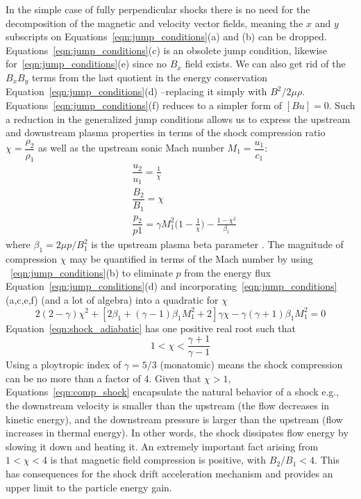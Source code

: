 In the simple case of fully perpendicular shocks there is no need for the decomposition of the magnetic and velocity vector fields, meaning the $x$ and $y$ subscripts on Equations~\ref{eqn:jump_conditions}(a) and (b) can be dropped. Equations~\ref{eqn:jump_conditions}(c) is an obsolete jump condition, likewise for~\ref{eqn:jump_conditions}(e) since no $B_x$ field exists. We can also get rid of the $B_{x}B_{y}$ terms from the last quotient in the energy conservation Equation~\ref{eqn:jump_conditions}(d) --replacing it simply with $B^{2}/2\mu\rho$. Equations~\ref{eqn:jump_conditions}(f) reduces to a simpler form of $[Bu]=0$. Such a reduction in the generalized jump conditions allows us to express the upstream and downstream plasma properties in terms of the shock compression ratio $\chi=\dfrac{\rho_{2}}{\rho_{1}}$ as well as the upstream sonic Mach number $M_{1}=\dfrac{u_{1}}{c_{1}}$:
\begin{subequations}
\begin{align}
&\dfrac{u_{2}}{u_{1}}=\frac{1}{\chi} \\
&\dfrac{B_{2}}{B_{1}}=\chi \\
&\dfrac{p_{2}}{p{1}}=\gamma M_{1}^2\bigg(1-\frac{1}{\chi}\bigg) - \frac{1-\chi^2}{\beta_{1}}
\end{align}
\label{eqn:comp_shock}
\end{subequations}
where $\beta_{1}=2\mu p/B_{1}^2$ is the upstream plasma beta parameter \citep{priest2000}. The magnitude of compression $\chi$ may be quantified in terms of the Mach number by using ~\ref{eqn:jump_conditions}(b) to eliminate $p$ from the energy flux Equation~\ref{eqn:jump_conditions}(d) and incorporating~\ref{eqn:jump_conditions}(a,c,e,f) (and a lot of algebra) into a quadratic for $\chi$
\begin{equation}
2(2-\gamma)\chi^{2}+[2\beta_{1}+(\gamma-1)\beta_{1}M_{1}^2+2]\gamma\chi - \gamma(\gamma+1)\beta_{1}M_{1}^2=0
\label{eqn:shock_adiabatic}
\end{equation}
Equation~\ref{eqn:shock_adiabatic} has one positive real root such that 
\begin{equation}
1< \chi < \frac{\gamma+1}{\gamma-1}
\label{eqn:compression}
\end{equation}
Using a ploytropic index of $\gamma=5/3$ (monatomic) means the shock compression can be no more than a factor of 4. Given that $\chi>1$, Equations~\ref{eqn:comp_shock} encapsulate the natural behavior of a shock e.g., the downstream velocity is smaller than the upstream (the flow decreases in kinetic energy), and the downstream pressure is larger than the upstream (flow increases in thermal energy). In other words, the shock dissipates flow energy by slowing it down and heating it. An extremely important fact arising from $1<\chi<4$ is that magnetic field compression is positive, with $B_{2}/B_{1} <4$. This has consequences for the shock drift acceleration mechanism and provides an upper limit to the particle energy gain.

